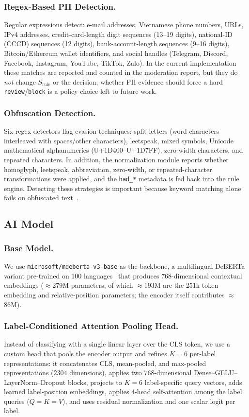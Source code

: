 \documentclass[runningheads]{llncs}
\begin{document}
\subsubsection{Regex-Based PII Detection.}
Regular expressions detect: e-mail addresses, Vietnamese phone numbers, URLs, IPv4 addresses, credit-card-length digit sequences (13--19 digits), national-ID (CCCD) sequences (12 digits), bank-account-length sequences (9--16 digits), Bitcoin/Ethereum wallet identifiers, and social handles (Telegram, Discord, Facebook, Instagram, YouTube, TikTok, Zalo).
In the current implementation these matches are reported and counted in the moderation report, but they do \emph{not} change $S_{\mathrm{rule}}$ or the decision; whether PII evidence should force a hard \texttt{review}/\texttt{block} is a policy choice left to future work.

\subsubsection{Obfuscation Detection.}
Six regex detectors flag evasion techniques: split letters (word characters interleaved with spaces/other characters), leetspeak, mixed symbols, Unicode mathematical alphanumerics (U+1D400--U+1D7FF), zero-width characters, and repeated characters.
In addition, the normalization module reports whether homoglyph, leetspeak, abbreviation, zero-width, or repeated-character transformations were applied, and the \texttt{had\_*} metadata is fed back into the rule engine.
Detecting these strategies is important because keyword matching alone fails on obfuscated text~\cite{cooper2023,mishra2018,boucher2022}.

\subsection{AI Model}

\subsubsection{Base Model.}
We use \texttt{microsoft/mdeberta-v3-base} as the backbone, a multilingual DeBERTa variant pre-trained on 100 languages~\cite{he2023debertav3} that produces 768-dimensional contextual embeddings ($\approx$279M parameters, of which $\approx$193M are the 251k-token embedding and relative-position parameters; the encoder itself contributes $\approx$86M).

\subsubsection{Label-Conditioned Attention Pooling Head.}
Instead of classifying with a single linear layer over the CLS token, we use a custom head that pools the encoder output and refines $K=6$ per-label representations: it concatenates CLS, mean-pooled, and max-pooled representations ($2304$ dimensions), applies two 768-dimensional Dense--GELU--LayerNorm--Dropout blocks, projects to $K=6$ label-specific query vectors, adds learned label-position embeddings, applies 4-head self-attention among the label queries ($Q=K=V$), and uses residual normalization and one scalar logit per label.
\end{document}
